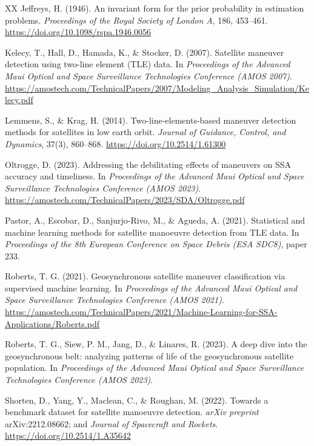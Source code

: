 \documentclass[11pt]{article}
\begin{document}
\begin{thebibliography}{XX}
 Jeffreys, H. (1946). An invariant form for the prior probability in estimation problems. \emph{Proceedings of the Royal Society of London A}, 186, 453--461. \url{https://doi.org/10.1098/rspa.1946.0056}

 Kelecy, T., Hall, D., Hamada, K., \& Stocker, D. (2007). Satellite maneuver detection using two-line element (TLE) data. In \emph{Proceedings of the Advanced Maui Optical and Space Surveillance Technologies Conference (AMOS 2007)}. \url{https://amostech.com/TechnicalPapers/2007/Modeling_Analysis_Simulation/Kelecy.pdf}

 Lemmens, S., \& Krag, H. (2014). Two-line-elements-based maneuver detection methods for satellites in low earth orbit. \emph{Journal of Guidance, Control, and Dynamics}, 37(3), 860--868. \url{https://doi.org/10.2514/1.61300}

 Oltrogge, D. (2023). Addressing the debilitating effects of maneuvers on SSA accuracy and timeliness. In \emph{Proceedings of the Advanced Maui Optical and Space Surveillance Technologies Conference (AMOS 2023)}. \url{https://amostech.com/TechnicalPapers/2023/SDA/Oltrogge.pdf}

 Pastor, A., Escobar, D., Sanjurjo-Rivo, M., \& Agueda, A. (2021). Statistical and machine learning methods for satellite manoeuvre detection from TLE data. In \emph{Proceedings of the 8th European Conference on Space Debris (ESA SDC8)}, paper 233.

 Roberts, T. G. (2021). Geosynchronous satellite maneuver classification via supervised machine learning. In \emph{Proceedings of the Advanced Maui Optical and Space Surveillance Technologies Conference (AMOS 2021)}. \url{https://amostech.com/TechnicalPapers/2021/Machine-Learning-for-SSA-Applications/Roberts.pdf}

 Roberts, T. G., Siew, P. M., Jang, D., \& Linares, R. (2023). A deep dive into the geosynchronous belt: analyzing patterns of life of the geosynchronous satellite population. In \emph{Proceedings of the Advanced Maui Optical and Space Surveillance Technologies Conference (AMOS 2023)}.

 Shorten, D., Yang, Y., Maclean, C., \& Roughan, M. (2022). Towards a benchmark dataset for satellite manoeuvre detection. \emph{arXiv preprint} arXiv:2212.08662; and \emph{Journal of Spacecraft and Rockets}. \url{https://doi.org/10.2514/1.A35642}


\end{thebibliography}
\end{document}
